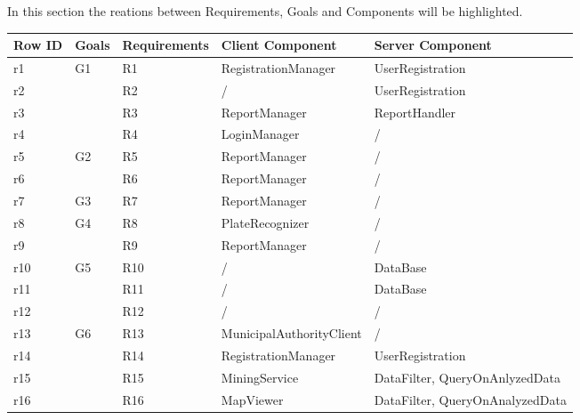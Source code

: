 In this section the reations between Requirements, Goals and Components will be highlighted.\\

\begin{table}[h!]
	\centering
	\begin{tabular}{|l|l|l|l|l|}
	\hline
	\textbf{Row ID}		&	\textbf{Goals}		& \textbf{Requirements}	& \textbf{Client Component}			&\textbf{Server Component}\\ \hline
 			r1						&\multirow{4}{*}{G1}			&   	R1 								&  RegistrationManager								&UserRegistration\\\cline{3-5}\cline{0-0}
 			r2						&											& 		R2								&	 /																&UserRegistration\\\cline{3-5}\cline{0-0}
 			r3						&											&   	R3 								&  ReportManager										&ReportHandler\\\cline{3-5}\cline{0-0}
 			r4						&											&   	R4 								&  LoginManager										&/\\\cline{3-5}\cline{0-0} \hline
 											
 			r5						&\multirow{2}{*}{G2}			&   	R5 								&  ReportManager										&/\\\cline{3-5}\cline{0-0}
 			r6						&											&   	R6 								&  ReportManager										&/\\\cline{3-5} \cline{0-0}\hline
 											
 			r7						&\multirow{1}{*}{G3}			&	   	R7 								&  ReportManager										&/\\\cline{3-5}\cline{0-0}\hline
 	
 			r8						&\multirow{2}{*}{G4}			&   	R8 								&  PlateRecognizer										&/\\\cline{3-5}\cline{0-0}
 			r9						&											&   	R9 								&  ReportManager										&/\\\cline{3-5}\cline{0-0} \hline
 											
 			r10					&\multirow{3}{*}{G5}			&   	R10 								&  /																&DataBase\\\cline{3-5}\cline{0-0}
 			r11					&											&   	R11 								&  /																&DataBase\\\cline{3-5}\cline{0-0}
 			r12					&											&   	R12 								&  /																&/\\\cline{3-5}\cline{0-0}\hline
 											
 			r13					&\multirow{4}{*}{G6}			&   	R13 								&  MunicipalAuthorityClient						&/\\\cline{3-5}\cline{0-0}
 			r14					&											&   	R14 								&  RegistrationManager								&UserRegistration\\\cline{3-5}\cline{0-0}
 			r15					&											&   	R15 								&  MiningService										&DataFilter, QueryOnAnlyzedData\\\cline{3-5}\cline{0-0}
 			r16					&											&   	R16 								&  MapViewer												&DataFilter, QueryOnAnalyzedData\\\cline{3-5}\cline{0-0}\hline
 											

\end{tabular}
\end{table}
